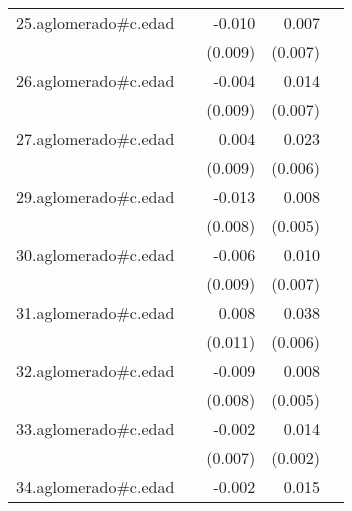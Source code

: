 {\begin{longtable}{l*{4}{D{.}{.}{-1}}}
\addlinespace
25.aglomerado#c.edad&                     &      -0.010         &       0.007         &                     \\
            &                     &     (0.009)         &     (0.007)         &                     \\
\addlinespace
26.aglomerado#c.edad&                     &      -0.004         &       0.014\sym{*}  &                     \\
            &                     &     (0.009)         &     (0.007)         &                     \\
\addlinespace
27.aglomerado#c.edad&                     &       0.004         &       0.023\sym{***}&                     \\
            &                     &     (0.009)         &     (0.006)         &                     \\
\addlinespace
29.aglomerado#c.edad&                     &      -0.013         &       0.008         &                     \\
            &                     &     (0.008)         &     (0.005)         &                     \\
\addlinespace
30.aglomerado#c.edad&                     &      -0.006         &       0.010         &                     \\
            &                     &     (0.009)         &     (0.007)         &                     \\
\addlinespace
31.aglomerado#c.edad&                     &       0.008         &       0.038\sym{***}&                     \\
            &                     &     (0.011)         &     (0.006)         &                     \\
\addlinespace
32.aglomerado#c.edad&                     &      -0.009         &       0.008         &                     \\
            &                     &     (0.008)         &     (0.005)         &                     \\
\addlinespace
33.aglomerado#c.edad&                     &      -0.002         &       0.014\sym{***}&                     \\
            &                     &     (0.007)         &     (0.002)         &                     \\
\addlinespace
34.aglomerado#c.edad&                     &      -0.002         &       0.015\sym{*}  &                     \\

\end{longtable}}
